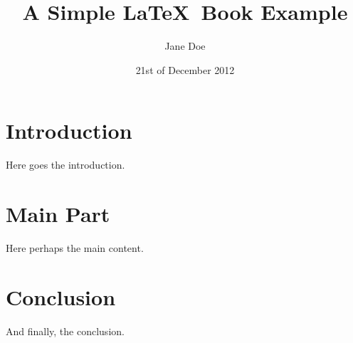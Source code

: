 \documentclass[12pt]{book}
\title{A Simple \LaTeX \ Book Example}
\author{Jane Doe}
\date{21st of December 2012}
\begin{document}
\maketitle
\tableofcontents

\chapter{Introduction}

Here goes the introduction.


\chapter{Main Part}

Here perhaps the main content.


\chapter{Conclusion}

And finally, the conclusion.
\end{document}
